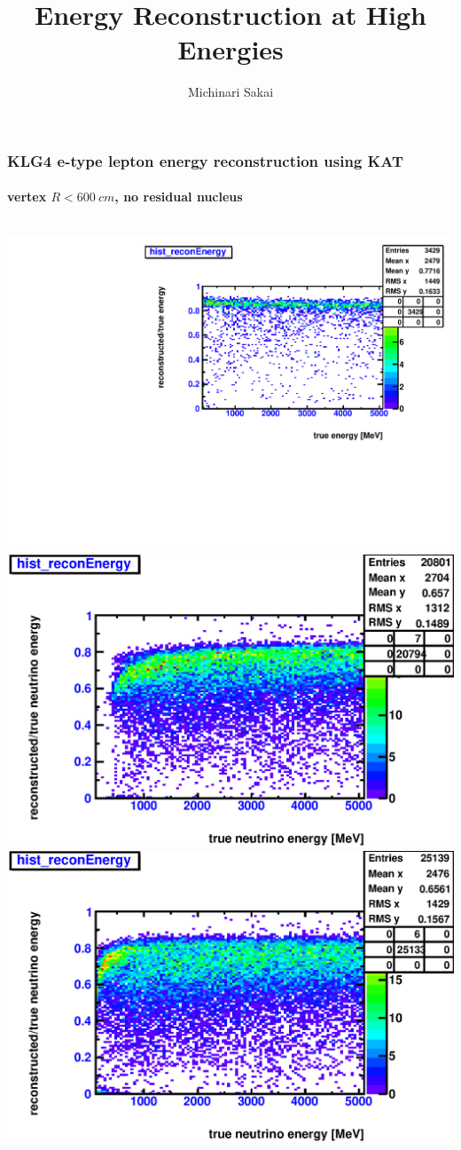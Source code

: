 \documentclass{beamer}
\title{Energy Reconstruction at High Energies}
\author[Michinari]{Michinari Sakai}
\begin{document}
\frame{\titlepage}

\begin{frame}
	\frametitle{KLG4 e-type lepton energy reconstruction using KAT}
	\framesubtitle{vertex $R < \SI{600}{cm}$, no residual nucleus}
	\begin{columns}[T]
		\includegraphics[width=1.0\textwidth]{analyzed_mtq_flatSpectrum_e-_outerBufferFillAll_reconVSTrueEnergy_maxR600cm.pdf}
		\includegraphics[width=1.0\textwidth]{nue_H1_reconVSTrueNuEnergy_onlyCC_maxR600cm.eps}
		\includegraphics[width=1.0\textwidth]{nue_C12_reconVSTrueNuEnergy_onlyCC_maxR600cm.eps}

\end{columns}
\end{frame}
\end{document}
